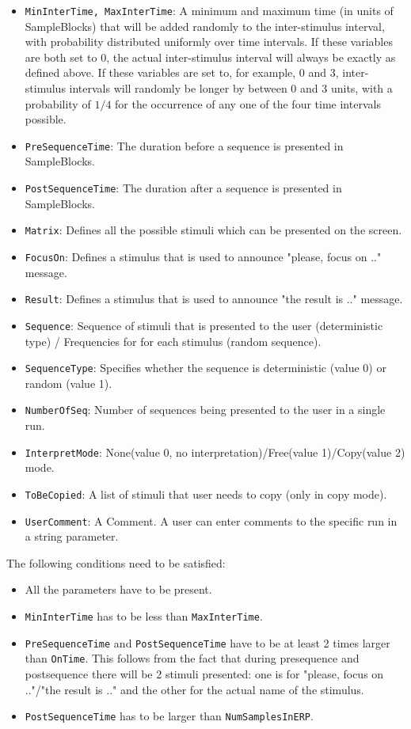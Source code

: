 \documentclass[letterpaper,oneside,12pt]{article}
\begin{document}
\begin{itemize}
{       screen is blank and audio is turned off.}
 \item {\tt MinInterTime, MaxInterTime}: A minimum and maximum time (in units of SampleBlocks) that will be added randomly
       to the inter-stimulus interval, with probability distributed uniformly over time
       intervals.
       If these variables are both set to 0, the actual inter-stimulus interval will
       always be exactly as defined above.
       If these variables are set to, for example, 0 and 3, inter-stimulus intervals
       will randomly be longer by between 0 and 3 units, with a probability of $1/4$
       for the occurrence of any one of the four time intervals possible.
 \item {\tt PreSequenceTime}: The duration before a sequence is presented in SampleBlocks.
 \item {\tt PostSequenceTime}: The duration after a sequence is presented in SampleBlocks.
 \item {\tt Matrix}: Defines all the possible stimuli which can be presented on the screen.
 \item {\tt FocusOn}: Defines a stimulus that is used to announce "please, focus on .." message.
 \item {\tt Result}: Defines a stimulus that is used to announce "the result is .." message.
 \item {\tt Sequence}: Sequence of stimuli that is presented to the user (deterministic type) / Frequencies for for each stimulus (random sequence).
 \item {\tt SequenceType}: Specifies whether the sequence is deterministic (value 0) or random (value 1).
 \item {\tt NumberOfSeq}: Number of sequences being presented to the user in a single run.
 \item {\tt InterpretMode}: None(value 0, no interpretation)/Free(value 1)/Copy(value 2) mode.
 \item {\tt ToBeCopied}: A list of stimuli that user needs to copy (only in copy mode). 
 \item {\tt UserComment}: A Comment. A user can enter comments to the specific run in a string parameter.
\end{itemize}

The following conditions need to be satisfied: 
\begin{itemize}
  \item All the parameters have to be present.
  \item {\tt MinInterTime} has to be less than {\tt MaxInterTime}.
  \item {\tt PreSequenceTime} and {\tt PostSequenceTime} have to be at least 2 times larger than {\tt OnTime}. This follows from the fact
  	that during presequence and postsequence there will be 2 stimuli presented: one is for "please, focus on .."/"the result is .." and the
  	other for the actual name of the stimulus.		
  \item {\tt PostSequenceTime} has to be larger than {\tt NumSamplesInERP}.
\end{itemize}
\end{document}
